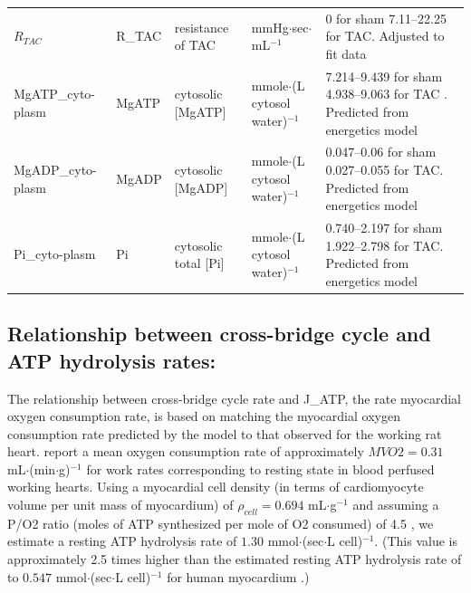 \documentclass[fleqn,10pt]{physiome}
\begin{document}
\begin{table}[!htb]
\begin{supertabular}{p{1.8cm} p{1.4cm} p{3.0cm} p{1.8cm} p{3.6cm}}
$R_{TAC}$ & R\_TAC & resistance of TAC & mmHg$\cdot$sec$\cdot$ mL$^{-1}$  &  0 for sham
7.11--22.25 for TAC.
 Adjusted to fit data
 \\

MgATP\_cyto-plasm
 & MgATP & cytosolic [MgATP] & mmole$\cdot$(L cytosol water)$^{-1}$
 &  7.214--9.439 for sham
4.938--9.063 for TAC .
Predicted from energetics model 
 \\

MgADP\_cyto-plasm
  & MgADP & cytosolic [MgADP] & mmole$\cdot$(L cytosol water)$^{-1}$
  &  0.047--0.06 for sham
0.027--0.055 for TAC.
Predicted from energetics model 
 \\

Pi\_cyto-plasm
  & Pi & cytosolic total [Pi] & mmole$\cdot$(L cytosol water)$^{-1}$
 &  0.740--2.197 for sham
1.922--2.798 for TAC.
Predicted from energetics model \\

\bottomrule
\end{supertabular}
\end{table}

\subsection{Relationship between cross-bridge cycle and ATP hydrolysis rates:}

The relationship between cross-bridge cycle rate and J\_ATP, the rate myocardial oxygen consumption rate, is based on matching the myocardial oxygen consumption rate predicted by the model to that observed for the working rat heart. \cite{Duevelleroy1976} report a mean oxygen consumption rate of approximately $MVO2 = 0.31$ mL$\cdot$(min$\cdot$g)$^{-1}$ for work rates corresponding to resting state in blood perfused working hearts. Using a myocardial cell density (in terms of cardiomyocyte volume per unit mass of myocardium) of $\rho_{cell} = 0.694$ mL$\cdot$g$^{-1}$ and assuming a P/O2 ratio (moles of ATP synthesized per mole of O2 consumed) of 4.5 \citep{Wu2008}, we estimate a resting ATP hydrolysis rate of $1.30$ mmol$\cdot$(sec$\cdot$L cell)$^{-1}$. (This value is approximately 2.5 times higher than the estimated resting ATP hydrolysis rate of to $0.547$ mmol$\cdot$(sec$\cdot$L cell)$^{-1}$ for human myocardium \citep{Gao2019}.) 
\end{document}
